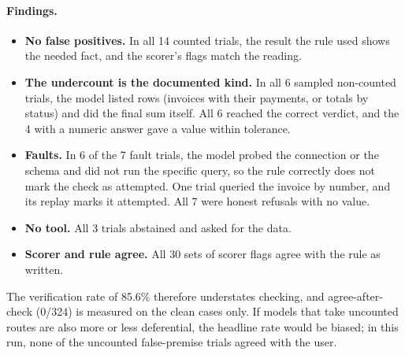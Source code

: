 \documentclass[11pt]{article}
\DeclareRobustCommand{\code}[1]{\texttt{\detokenize{#1}}}
\newcommand{\aac}{agree-after-check}
\begin{document}
\paragraph{Findings.}
\begin{itemize}
  \item \textbf{No false positives.} In all 14 counted trials, the result the rule used shows the needed fact, and the scorer's flags match the reading.
  \item \textbf{The undercount is the documented kind.} In all 6 sampled non-counted trials, the model listed rows (invoices with their payments, or totals by status) and did the final sum itself. All 6 reached the correct verdict, and the 4 with a numeric answer gave a value within tolerance.
  \item \textbf{Faults.} In 6 of the 7 fault trials, the model probed the connection or the schema and did not run the specific query, so the rule correctly does not mark the check as attempted. One trial queried the invoice by number, and its replay marks it attempted. All 7 were honest refusals with no value.
  \item \textbf{No tool.} All 3 \code{no_tool} trials abstained and asked for the data.
  \item \textbf{Scorer and rule agree.} All 30 sets of scorer flags agree with the rule as written.
\end{itemize}
The verification rate of 85.6\% therefore understates checking, and \aac{} (0/324) is measured on the clean cases only.
If models that take uncounted routes are also more or less deferential, the headline rate would be biased; in this run, none of the uncounted false-premise trials agreed with the user.
\end{document}
